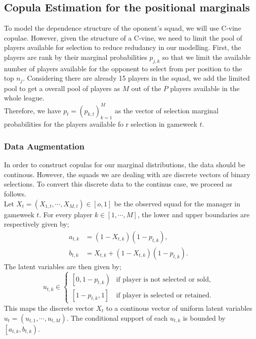 				\subsection{Copula Estimation for the positional marginals}
				To model the dependence structure of the oponent's squad, we will use C-vine copulae.
				However, given the structure of a C-vine, we need to limit the pool of players available for selection to reduce redudancy in our modelling.
				First, the players are rank by their marginal probabilities $p_{j,k}$ so that we limit the available number of players available for the opponent to select from per position to the top $n_j$. Considering there are already 15 players in the squad, we add the limited pool to get a overall pool of players as $M$ out of the $P$ players available in the whole league.\\
				Therefore, we have $p_t = \left( p_{k,t}\right)_{k=1}^M$ as the vector of selection marginal probabilities for the players available fo r selection in gameweek $t$.
				\subsubsection{Data Augmentation}
				In order to construct copulas for our marginal distributions, the data should be continous. However, the squads we are dealing with are discrete vectors of binary selections. To convert this discrete data to the continus case, we proceed as follows.\\
				Let $X_t = \left( X_{1,t}, \cdots, X_{M,t} \right) \in \left[o,1\right]$ be the observed squad for the manager in gameweek $t$. For every player $k \in [1, \cdots, M]$, the lower and upper boundaries are respectively given by;
				\begin{equation}\label{Eq:latent_boundaries}
					\begin{aligned}
						a_{t,k} &= \left(1-X_{t,k}\right) \left(1-p_{t,k}\right),\\
						b_{t,k} &= X_{t,k} + \left(1-X_{t,k}\right) \left(1-p_{t,k}\right).
					\end{aligned}
				\end{equation}
				The latent variables are then given by;
				\begin{equation}\label{Eq:latent_variables}
					u_{t,k} \in
					\begin{cases}
						\left[0,1-p_{t,k}\right) & \text{if player is not selected or sold},\\
						\left[1-p_{t,k}, 1\right] &\text{if player is selected or retained}.
					\end{cases}
				\end{equation}
				This maps the discrete vector $X_t$ to a continous vector of uniform latent variables $u_{t} = \left(u_{t,1}, \cdots, u_{t,M}\right)$. The conditional support of each $u_{t,k}$ is bounded by $\left[a_{t,k},b_{t,k}\right)$.

